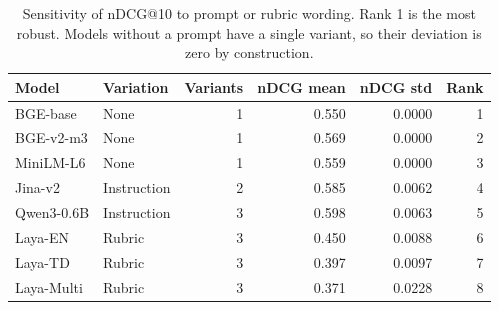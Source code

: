 \begin{table}[t]
\centering
\small
\caption{Sensitivity of nDCG@10 to prompt or rubric wording. Rank 1 is the most robust. Models without a prompt have a single variant, so their deviation is zero by construction.}
\label{tab:prompts}
\begin{tabular}{llrrrr}
\toprule
Model & Variation & Variants & nDCG mean & nDCG std & Rank \\
\midrule
BGE-base & None & 1 & 0.550 & 0.0000 & 1 \\
BGE-v2-m3 & None & 1 & 0.569 & 0.0000 & 2 \\
MiniLM-L6 & None & 1 & 0.559 & 0.0000 & 3 \\
Jina-v2 & Instruction & 2 & 0.585 & 0.0062 & 4 \\
Qwen3-0.6B & Instruction & 3 & 0.598 & 0.0063 & 5 \\
Laya-EN & Rubric & 3 & 0.450 & 0.0088 & 6 \\
Laya-TD & Rubric & 3 & 0.397 & 0.0097 & 7 \\
Laya-Multi & Rubric & 3 & 0.371 & 0.0228 & 8 \\
\bottomrule
\end{tabular}
\end{table}
